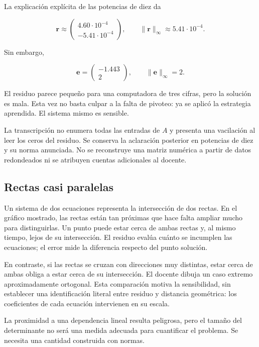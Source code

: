 \documentclass[12pt,a4paper]{article}
\begin{document}
La explicación explícita de las potencias de diez da

\[
\mathbf r\approx\begin{pmatrix}4.60\cdot10^{-4}\\-5.41\cdot10^{-4}\end{pmatrix},
\qquad \|\mathbf r\|_\infty\approx5.41\cdot10^{-4}.
\]

Sin embargo,

\[
\mathbf e=\begin{pmatrix}-1.443\\2\end{pmatrix},\qquad
\boxed{\|\mathbf e\|_\infty=2}.
\]

El residuo parece pequeño para una computadora de tres cifras, pero la solución es mala. Esta vez no basta culpar a la falta de pivoteo: ya se aplicó la estrategia aprendida. El sistema mismo es sensible.

\begin{notebox}
La transcripción no enumera todas las entradas de $A$ y presenta una vacilación al leer los ceros del residuo. Se conserva la aclaración posterior en potencias de diez y su norma anunciada. No se reconstruye una matriz numérica a partir de datos redondeados ni se atribuyen cuentas adicionales al docente.
\end{notebox}

\subsection{Rectas casi paralelas}

Un sistema de dos ecuaciones representa la intersección de dos rectas. En el gráfico mostrado, las rectas están tan próximas que hace falta ampliar mucho para distinguirlas. Un punto puede estar cerca de ambas rectas y, al mismo tiempo, lejos de su intersección. El residuo evalúa cuánto se incumplen las ecuaciones; el error mide la diferencia respecto del punto solución.

En contraste, si las rectas se cruzan con direcciones muy distintas, estar cerca de ambas obliga a estar cerca de su intersección. El docente dibuja un caso extremo aproximadamente ortogonal. Esta comparación motiva la sensibilidad, sin establecer una identificación literal entre residuo y distancia geométrica: los coeficientes de cada ecuación intervienen en su escala.


La proximidad a una dependencia lineal resulta peligrosa, pero el tamaño del determinante no será una medida adecuada para cuantificar el problema. Se necesita una cantidad construida con normas.
\end{document}
